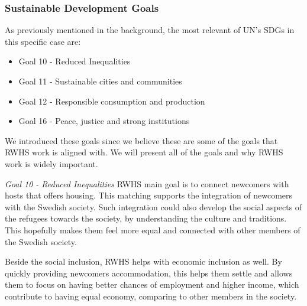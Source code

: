 

\subsubsection{Sustainable Development Goals}
\label{sec:discussion-sdg}
As previously mentioned in the background, the most relevant of UN's SDGs in this specific case are:
\begin{itemize}
\item Goal 10 - Reduced Inequalities
\item Goal 11 - Sustainable cities and communities 
\item Goal 12 - Responsible consumption and production
\item Goal 16 - Peace, justice and strong institutions
\end{itemize}
We introduced these goals since we believe these are some of the goals that RWHS work is aligned with. We will present all of the goals and why RWHS work is widely important. 

\textit{Goal 10 - Reduced Inequalities} 
RWHS main goal is to connect newcomers with hosts that offers housing. This matching supports the integration of newcomers with the Swedish society. Such integration could also develop the social aspects of the refugees towards the society, by understanding the culture and traditions. This hopefully makes them feel more equal and connected with other members of the Swedish society.

Beside the social inclusion, RWHS helps with economic inclusion as well. By quickly providing newcomers accommodation, this helps them settle and allows them to focus on having better chances of employment and higher income, which contribute to having equal economy, comparing to other members in the society.

